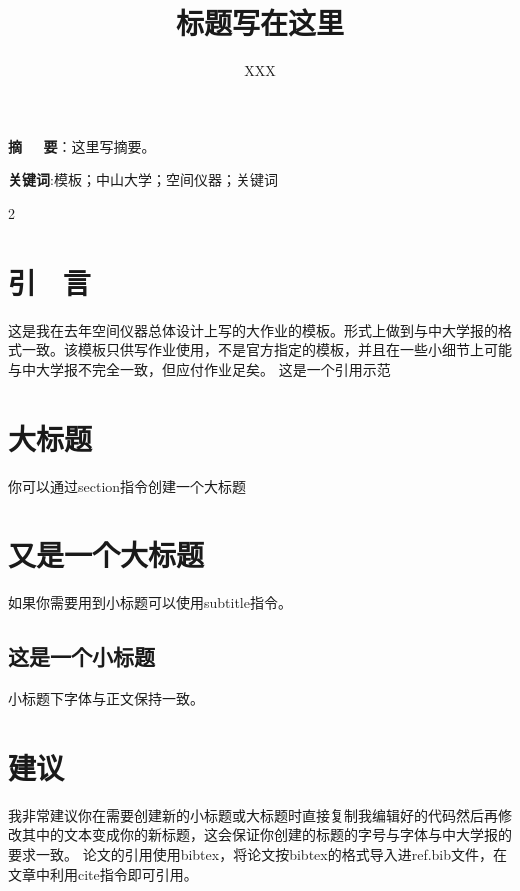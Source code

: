 \documentclass{article}
\title{\zihao{2}\songti \textbf{标题写在这里}}
\author{\zihao{-4}\kaishu XXX}
\affil{\zihao{5}\kaishu 中山大学物理与天文学院，广东 \ 珠海519082}
\date{}
\begin{document}
\maketitle
\thispagestyle{mystyle}
\noindent
{}\songti \textbf{摘 \ \ 要}：这里写摘要。

\noindent
\textbf{关键词}:模板；中山大学；空间仪器；关键词
\setlength\columnsep{0.8cm} %
\begin{multicols}{2} %
\section{\kaishu 引 \ 言}
\songti 这是我在去年空间仪器总体设计上写的大作业的模板。形式上做到与中大学报的格式一致。该模板只供写作业使用，不是官方指定的模板，并且在一些小细节上可能与中大学报不完全一致，但应付作业足矣。 这是一个引用示范\cite{1998Gravitational}
\section{\kaishu 大标题}
你可以通过section指令创建一个大标题
\section{\kaishu 又是一个大标题}
如果你需要用到小标题可以使用subtitle指令。
\subsection{\songti 这是一个小标题}
小标题下字体与正文保持一致。
\section{\kaishu 建议}
我非常建议你在需要创建新的小标题或大标题时直接复制我编辑好的代码然后再修改其中的文本变成你的新标题，这会保证你创建的标题的字号与字体与中大学报的要求一致。
论文的引用使用bibtex，将论文按bibtex的格式导入进ref.bib文件，在文章中利用cite指令即可引用。
\end{multicols}

\end{document}
